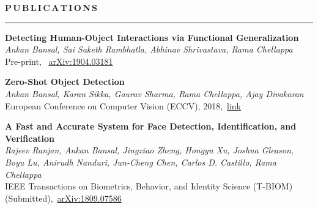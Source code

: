 \documentclass[11pt, a4paper]{article}
\begin{document}
%

\textbf{P\,U\,B\,L\,I\,C\,A\,T\,I\,O\,N\,S}
\vspace{5pt}
\hrule
\vspace{7pt}

\textbf{Detecting Human-Object Interactions via Functional Generalization}\\
\textit{Ankan Bansal, Sai Saketh Rambhatla, Abhinav Shrivastava, Rama Chellappa}\\
Pre-print, ~\href{https://arxiv.org/abs/1904.03181}{arXiv:1904.03181}

\vspace{4pt}

\textbf{Zero-Shot Object Detection}\\
\textit{Ankan Bansal, Karan Sikka, Gaurav Sharma, Rama Chellappa, Ajay Divakaran}\\
European Conference on Computer Vision (ECCV), 2018,~\href{http://openaccess.thecvf.com/content_ECCV_2018/html/Ankan_Bansal_Zero-Shot_Object_Detection_ECCV_2018_paper.html}{link}

\vspace{4pt}

\textbf{A Fast and Accurate System for Face Detection, Identification, and Verification} \\
\textit{Rajeev Ranjan, Ankan Bansal, Jingxiao Zheng, Hongyu Xu, Joshua Gleason, Boyu Lu, Anirudh
Nanduri, Jun-Cheng Chen, Carlos D. Castillo, Rama Chellappa}\\
IEEE Transactions on Biometrics, Behavior, and Identity Science (T-BIOM) (Submitted),~\href{https://arxiv.org/abs/1809.07586}{arXiv:1809.07586}
\end{document}

